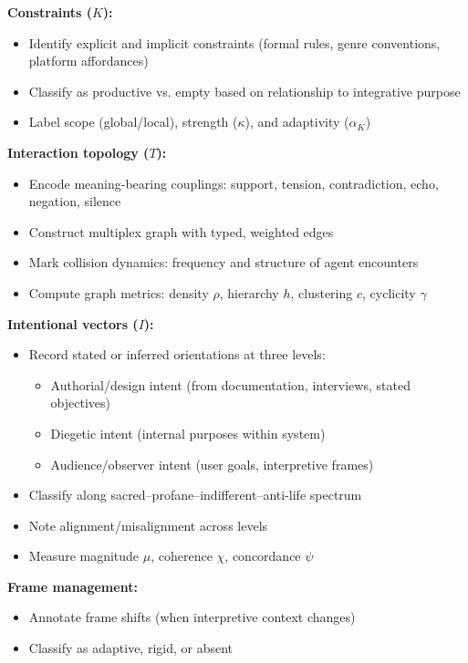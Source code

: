 \documentclass[12pt]{article}
\begin{document}
\textbf{Constraints ($K$):}
\begin{itemize}
\item Identify explicit and implicit constraints (formal rules, genre conventions, platform affordances)
\item Classify as productive vs. empty based on relationship to integrative purpose
\item Label scope (global/local), strength ($\kappa$), and adaptivity ($\alpha_K$)
\end{itemize}

\textbf{Interaction topology ($T$):}
\begin{itemize}
\item Encode meaning-bearing couplings: support, tension, contradiction, echo, negation, silence
\item Construct multiplex graph with typed, weighted edges
\item Mark collision dynamics: frequency and structure of agent encounters
\item Compute graph metrics: density $\rho$, hierarchy $h$, clustering $c$, cyclicity $\gamma$
\end{itemize}

\textbf{Intentional vectors ($I$):}
\begin{itemize}
\item Record stated or inferred orientations at three levels:
  \begin{itemize}
  \item Authorial/design intent (from documentation, interviews, stated objectives)
  \item Diegetic intent (internal purposes within system)
  \item Audience/observer intent (user goals, interpretive frames)
  \end{itemize}
\item Classify along sacred–profane–indifferent–anti-life spectrum
\item Note alignment/misalignment across levels
\item Measure magnitude $\mu$, coherence $\chi$, concordance $\psi$
\end{itemize}

\textbf{Frame management:}
\begin{itemize}
\item Annotate frame shifts (when interpretive context changes)
\item Classify as adaptive, rigid, or absent
\end{itemize}
\end{document}
